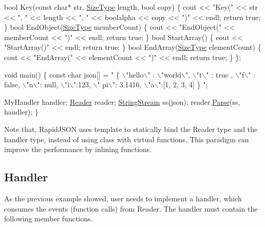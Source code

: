 \begin{DoxyCode}
    \textcolor{keywordtype}{bool} Key(\textcolor{keyword}{const} \textcolor{keywordtype}{char}* str, \hyperlink{rapidjson_8h_a5ed6e6e67250fadbd041127e6386dcb5}{SizeType} length, \textcolor{keywordtype}{bool} copy) \{ 
        cout << \textcolor{stringliteral}{"Key("} << str << \textcolor{stringliteral}{", "} << length << \textcolor{stringliteral}{", "} << boolalpha << copy << \textcolor{stringliteral}{")"} << endl;
        \textcolor{keywordflow}{return} \textcolor{keyword}{true};
    \}
    \textcolor{keywordtype}{bool} EndObject(\hyperlink{rapidjson_8h_a5ed6e6e67250fadbd041127e6386dcb5}{SizeType} memberCount) \{ cout << \textcolor{stringliteral}{"EndObject("} << memberCount << \textcolor{stringliteral}{")"} << endl; \textcolor{keywordflow}{
      return} \textcolor{keyword}{true}; \}
    \textcolor{keywordtype}{bool} StartArray() \{ cout << \textcolor{stringliteral}{"StartArray()"} << endl; \textcolor{keywordflow}{return} \textcolor{keyword}{true}; \}
    \textcolor{keywordtype}{bool} EndArray(\hyperlink{rapidjson_8h_a5ed6e6e67250fadbd041127e6386dcb5}{SizeType} elementCount) \{ cout << \textcolor{stringliteral}{"EndArray("} << elementCount << \textcolor{stringliteral}{")"} << endl; \textcolor{keywordflow}{
      return} \textcolor{keyword}{true}; \}
\};

\textcolor{keywordtype}{void} main() \{
    \textcolor{keyword}{const} \textcolor{keywordtype}{char} json[] = \textcolor{stringliteral}{" \{ \(\backslash\)"hello\(\backslash\)" : \(\backslash\)"world\(\backslash\)", \(\backslash\)"t\(\backslash\)" : true , \(\backslash\)"f\(\backslash\)" : false, \(\backslash\)"n\(\backslash\)": null, \(\backslash\)"i\(\backslash\)":123, \(\backslash\)"
      pi\(\backslash\)": 3.1416, \(\backslash\)"a\(\backslash\)":[1, 2, 3, 4] \} "};

    MyHandler handler;
    \hyperlink{class_generic_reader}{Reader} reader;
    \hyperlink{struct_generic_string_stream}{StringStream} ss(json);
    reader.\hyperlink{class_generic_reader_a0c450620d14ff1824e58bb7bd9b42099}{Parse}(ss, handler);
\}
\end{DoxyCode}


Note that, Rapid\+J\+S\+ON uses template to statically bind the {\ttfamily Reader} type and the handler type, instead of using class with virtual functions. This paradigm can improve the performance by inlining functions.\hypertarget{md_Commun_Externe_RapidJSON_doc_sax.zh-cn_Handler}{}\subsection{Handler}\label{md_Commun_Externe_RapidJSON_doc_sax.zh-cn_Handler}
As the previous example showed, user needs to implement a handler, which consumes the events (function calls) from {\ttfamily Reader}. The handler must contain the following member functions.


